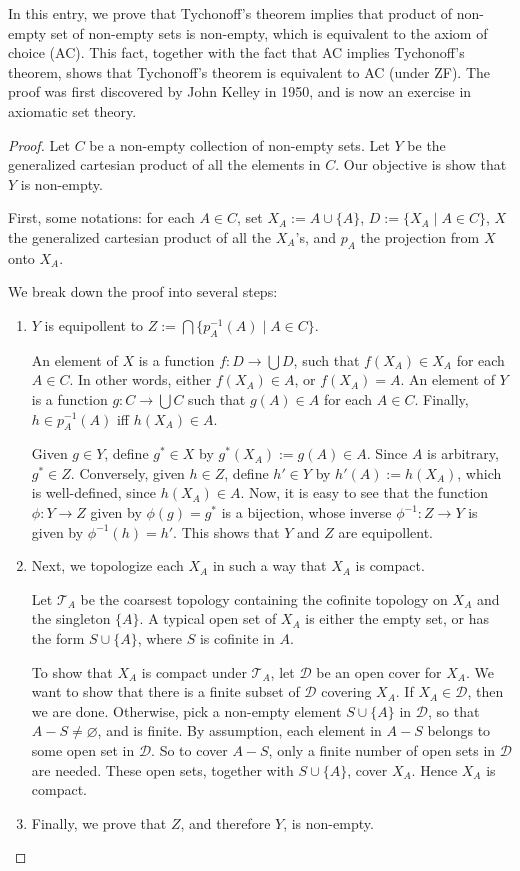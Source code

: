 \documentclass[12pt]{article}
\begin{document}
In this entry, we prove that Tychonoff's theorem implies that product of non-empty set of non-empty sets is non-empty, which is equivalent to the axiom of choice (AC).  This fact, together with the fact that AC implies Tychonoff's theorem, shows that Tychonoff's theorem is equivalent to AC (under ZF).  The proof was first discovered by John Kelley in 1950, and is now an exercise in axiomatic set theory.

\begin{proof}  Let $C$ be a non-empty collection of non-empty sets.  Let $Y$ be the generalized cartesian product of all the elements in $C$.  Our objective is show that $Y$ is non-empty.

First, some notations: for each $A\in C$, set $X_A:=A\cup \lbrace A\rbrace$, $D:=\lbrace X_A\mid A\in C\rbrace$, $X$ the generalized cartesian product of all the $X_A$'s, and $p_A$ the projection from $X$ onto $X_A$.

We break down the proof into several steps:

\begin{enumerate}
\item
$Y$ is equipollent to $Z:=\bigcap \lbrace p_A^{-1}(A)\mid A\in C\rbrace$.

An element of $X$ is a function $f: D\to \bigcup D$, such that $f(X_A)\in X_A$ for each $A\in C$.  In other words, either $f(X_A)\in A$, or $f(X_A)=A$.  An element of $Y$ is a function $g:C\to \bigcup C$ such that $g(A)\in A$ for each $A\in C$.  Finally, $h\in p_A^{-1}(A)$ iff $h(X_A)\in A$.  

Given $g\in Y$, define $g^*\in X$ by $g^*(X_A):=g(A)\in A$.  Since $A$ is arbitrary, $g^*\in Z$.  Conversely, given $h\in Z$, define $h'\in Y$ by $h'(A):=h(X_A)$, which is well-defined, since $h(X_A)\in A$.  Now, it is easy to see that the function $\phi:Y\to Z$ given by $\phi(g)=g^*$ is a bijection, whose inverse $\phi^{-1}:Z\to Y$ is given by $\phi^{-1}(h)=h'$.  This shows that $Y$ and $Z$ are equipollent.
\item
Next, we topologize each $X_A$ in such a way that $X_A$ is compact.

Let $\mathcal{T}_A$ be the coarsest topology containing the cofinite topology on $X_A$ and the singleton $\lbrace A\rbrace$.  A typical open set of $X_A$ is either the empty set, or has the form $S\cup \lbrace A\rbrace$, where $S$ is cofinite in $A$.  

To show that $X_A$ is compact under $\mathcal{T}_A$, let $\mathcal{D}$ be an open cover for $X_A$.  We want to show that there is a finite subset of $\mathcal{D}$ covering $X_A$.  If $X_A\in \mathcal{D}$, then we are done.  Otherwise, pick a non-empty element $S\cup \lbrace A\rbrace$ in $\mathcal{D}$, so that $A-S\ne \varnothing$, and is finite.  By assumption, each element in $A-S$ belongs to some open set in $\mathcal{D}$.  So to cover $A-S$, only a finite number of open sets in $\mathcal{D}$ are needed.  These open sets, together with $S\cup\lbrace A\rbrace$, cover $X_A$.  Hence $X_A$ is compact.
\item
Finally, we prove that $Z$, and therefore $Y$, is non-empty.


\end{enumerate}
\end{proof}
\end{document}
